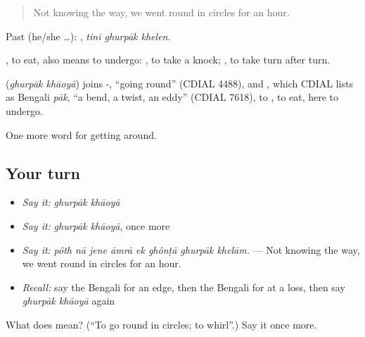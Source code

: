 \begin{quote}
Not knowing the way, we went round in circles for an hour.
\end{quote}

Past (he/she …):   , \emph{tini ghurpāk khelen}.

, to eat, also means to undergo:  , to take a knock;  , to take turn after turn.

\begin{cousinweb}
\textbf{ } (\emph{ghurpāk khāoyā}) joins -, \textquotedblleft{}going round\textquotedblright{} (CDIAL 4488), and , which CDIAL lists as Bengali \emph{pāk}, \textquotedblleft{}a bend, a twist, an eddy\textquotedblright{} (CDIAL 7618), to , to eat, here to undergo.
\end{cousinweb}

\begin{grammarlens}[title={What you've built}]
One more word for getting around.
\end{grammarlens}

\subsection*{Your turn}
\begin{itemize}
\raggedright
  \item \emph{Say it:} \emph{ghurpāk khāoyā}
  \item \emph{Say it:} \emph{ghurpāk khāoyā}, once more
  \item \emph{Say it:} \emph{pôth nā jene āmrā ek ghônṭā ghurpāk khelām.} — Not knowing the way, we went round in circles for an hour.
  \item \emph{Recall:} say the Bengali for an edge, then the Bengali for at a loss, then say \emph{ghurpāk khāoyā} again
\end{itemize}

\begin{tcolorbox}[breakable,colback=teal!4,colframe=teal!35!black,title={Before you move on}]
What does   mean? (\textquotedblleft{}To go round in circles; to whirl\textquotedblright{}.) Say it once more.
\end{tcolorbox}
